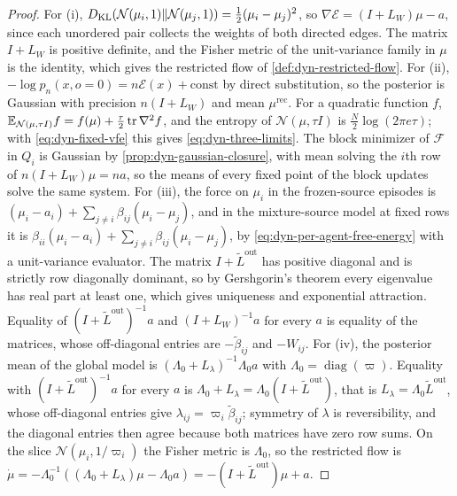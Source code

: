 \begin{proof}
For (i), $D_{\mathrm{KL}}(\mathcal N(\mu_i,1)\Vert\mathcal N(\mu_j,1))=\frac12(\mu_i-\mu_j)^2$, so $\nabla\mathcal E=(I+L_W)\mu-a$, since each unordered pair collects the weights of both directed edges. The matrix $I+L_W$ is positive definite, and the Fisher metric of the unit-variance family in $\mu$ is the identity, which gives the restricted flow of \cref{def:dyn-restricted-flow}. For (ii), $-\log p_n(x,o=0)=n\mathcal E(x)+\mathrm{const}$ by direct substitution, so the posterior is Gaussian with precision $n(I+L_W)$ and mean $\mu^{\mathrm{rec}}$. For a quadratic function $f$, $\mathbb E_{\mathcal N(\mu,\tau I)}f=f(\mu)+\frac\tau2\operatorname{tr}\nabla^2f$, and the entropy of $\mathcal N(\mu,\tau I)$ is $\frac N2\log(2\pi e\tau)$; with \cref{eq:dyn-fixed-vfe} this gives \cref{eq:dyn-three-limits}. The block minimizer of $\mathcal F$ in $Q_i$ is Gaussian by \cref{prop:dyn-gaussian-closure}, with mean solving the $i$th row of $n(I+L_W)\mu=na$, so the means of every fixed point of the block updates solve the same system. For (iii), the force on $\mu_i$ in the frozen-source episodes is $(\mu_i-a_i)+\sum_{j\neq i}\beta_{ij}(\mu_i-\mu_j)$, and in the mixture-source model at fixed rows it is $\beta_{ii}(\mu_i-a_i)+\sum_{j\neq i}\beta_{ij}(\mu_i-\mu_j)$, by \cref{eq:dyn-per-agent-free-energy} with a unit-variance evaluator. The matrix $I+\tilde L^{\mathrm{out}}$ has positive diagonal and is strictly row diagonally dominant, so by Gershgorin's theorem \citep{Gershgorin1931} every eigenvalue has real part at least one, which gives uniqueness and exponential attraction. Equality of $(I+\tilde L^{\mathrm{out}})^{-1}a$ and $(I+L_W)^{-1}a$ for every $a$ is equality of the matrices, whose off-diagonal entries are $-\tilde\beta_{ij}$ and $-W_{ij}$. For (iv), the posterior mean of the global model is $(\Lambda_0+L_\lambda)^{-1}\Lambda_0a$ with $\Lambda_0=\operatorname{diag}(\varpi)$. Equality with $(I+\tilde L^{\mathrm{out}})^{-1}a$ for every $a$ is $\Lambda_0+L_\lambda=\Lambda_0(I+\tilde L^{\mathrm{out}})$, that is $L_\lambda=\Lambda_0\tilde L^{\mathrm{out}}$, whose off-diagonal entries give $\lambda_{ij}=\varpi_i\tilde\beta_{ij}$; symmetry of $\lambda$ is reversibility, and the diagonal entries then agree because both matrices have zero row sums. On the slice $\mathcal N(\mu_i,1/\varpi_i)$ the Fisher metric is $\Lambda_0$, so the restricted flow is $\dot\mu=-\Lambda_0^{-1}((\Lambda_0+L_\lambda)\mu-\Lambda_0a)=-(I+\tilde L^{\mathrm{out}})\mu+a$.
\end{proof}

